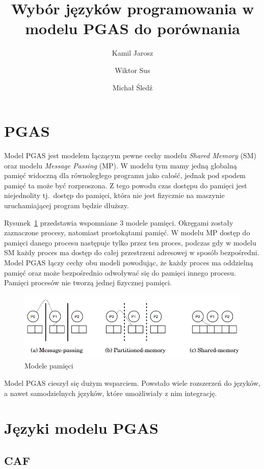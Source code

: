 \documentclass[twocolumn]{article}
\title{Wybór języków programowania w modelu PGAS do porównania}
\author{Kamil Jarosz \and Wiktor Sus \and Michał Śledź}
\begin{document}
\maketitle

\section{PGAS}

Model PGAS jest modelem łączącym pewne cechy modelu \textit{Shared Memory} (SM)
oraz modelu \textit{Message Passing} (MP).
W modelu tym mamy jedną globalną pamięć widoczną dla równoległego programu jako całość, jednak pod spodem
pamięć ta może być rozproszona.
Z tego powodu czas dostępu do pamięci jest niejednolity tj.\ dostęp do pamięci,
która nie jest fizycznie na maszynie uruchamiającej program będzie dłuższy.

Rysunek~\ref{fig:mem_models} przedstawia wspomniane 3 modele pamięci.
Okręgami zostały zaznaczone procesy, natomiast prostokątami pamięć.
W modelu MP dostęp do pamięci danego procesu następuje tylko przez ten proces,
podczas gdy w modelu SM każdy proces ma dostęp
do całej przestrzeni adresowej w sposób bezpośredni.
Model PGAS łączy cechy obu modeli powodując, że każdy proces ma oddzielną pamięć oraz
może bezpośrednio odwoływać się do pamięci innego procesu.
Pamięci procesów nie tworzą jednej fizycznej pamięci.

\begin{figure}[h]
    \centering
    \includegraphics[width=\columnwidth]{mem_models.png}
    \caption{Modele pamięci~\cite{pgas_paper}}
    \label{fig:mem_models}
\end{figure}

Model PGAS cieszył się dużym wsparciem.
Powstało wiele rozszerzeń do języków, a nawet samodzielnych języków,
które umożliwiały z nim integrację.

\section{Języki modelu PGAS}

\subsection{CAF}
\label{ssec:caf}
\end{document}
